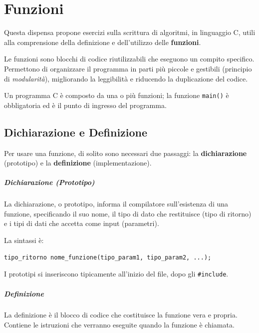 \documentclass[oneside]{scrbook}
\begin{document}
\chapter{Funzioni}

Questa dispensa propone esercizi sulla scrittura di algoritmi, in linguaggio C, utili alla comprensione della definizione e dell'utilizzo delle \textbf{funzioni}.

Le funzioni sono blocchi di codice riutilizzabili che eseguono un compito specifico. Permettono di organizzare il programma in parti più piccole e gestibili (principio di \emph{modularità}), migliorando la leggibilità e riducendo la duplicazione del codice.

Un programma C è composto da una o più funzioni; la funzione \texttt{main()} è obbligatoria ed è il punto di ingresso del programma.

\section{Dichiarazione e Definizione}

Per usare una funzione, di solito sono necessari due passaggi: la \textbf{dichiarazione} (prototipo) e la \textbf{definizione} (implementazione).

\paragraph{Dichiarazione (Prototipo)}

La dichiarazione, o prototipo, informa il compilatore sull'esistenza di una funzione, specificando il suo nome, il tipo di dato che restituisce (tipo di ritorno) e i tipi di dati che accetta come input (parametri).

La sintassi è:
\begin{lstlisting}[style=cstyle]
tipo_ritorno nome_funzione(tipo_param1, tipo_param2, ...);
\end{lstlisting}

I prototipi si inseriscono tipicamente all'inizio del file, dopo gli \texttt{\#include}.

\paragraph{Definizione}

La definizione è il blocco di codice che costituisce la funzione vera e propria. Contiene le istruzioni che verranno eseguite quando la funzione è chiamata.
\end{document}
